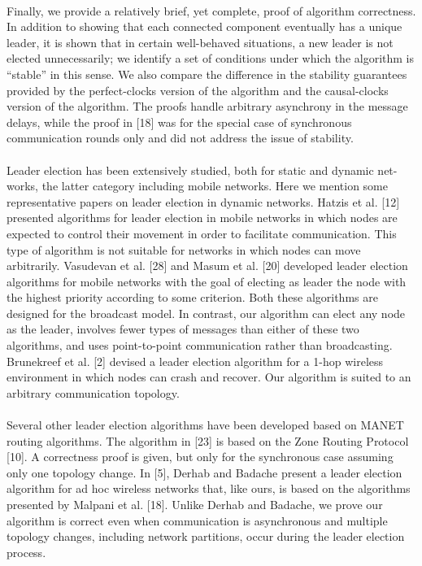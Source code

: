 \paragraph{}Finally, we provide a relatively brief, yet complete, proof of algorithm correctness. In addition to showing that each connected component eventually has a unique leader, it is shown that in certain well-behaved situations, a new leader is not elected unnecessarily; we identify a set of conditions under which the algorithm is “stable” in this sense. We also compare the difference in the stability guarantees provided by the perfect-clocks version of the algorithm and the causal-clocks version of the algorithm. The proofs handle arbitrary asynchrony in the message delays, while the proof in [18] was for the special case of synchronous communication rounds only and did not address the issue of stability.
\paragraph{}Leader election has been extensively studied, both for static and dynamic net- works, the latter category including mobile networks. Here we mention some representative papers on leader election in dynamic networks. Hatzis et al. [12] presented algorithms for leader election in mobile networks in which nodes are expected to control their movement in order to facilitate communication. This type of algorithm is not suitable for networks in which nodes can move arbitrarily. Vasudevan et al. [28] and Masum et al. [20] developed leader election algorithms for mobile networks with the goal of electing as leader the node with the highest priority according to some criterion. Both these algorithms are designed for the broadcast model. In contrast, our algorithm can elect any node as the leader, involves fewer types of messages than either of these two algorithms, and uses point-to-point communication rather than broadcasting. Brunekreef et al. [2] devised a leader election algorithm for a 1-hop wireless environment in which nodes can crash and recover. Our algorithm is suited to an arbitrary communication topology.
\paragraph{}Several other leader election algorithms have been developed based on MANET routing algorithms. The algorithm in [23] is based on the Zone Routing Protocol [10]. A correctness proof is given, but only for the synchronous case assuming only one topology change. In [5], Derhab and Badache present a leader election algorithm for ad hoc wireless networks that, like ours, is based on the algorithms presented by Malpani et al. [18]. Unlike Derhab and Badache, we prove our algorithm is correct even when communication is asynchronous and multiple topology changes, including network partitions, occur during the leader election process.
